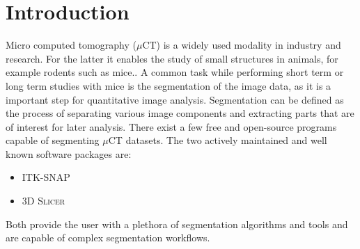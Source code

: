 




\clearpage

\section{Introduction}
\begin{body}
Micro computed tomography ($\mu$CT) is a widely used modality in industry and research. For the latter it enables the study of small structures in animals, for example rodents such as mice.\cite{percianoInsight3DMicroCT2017}.
A common task while performing short term or long term studies with mice is the segmentation of the image data, as it is a important step for quantitative image analysis\cite{sheppardTechniquesHelicalScanning2014}. Segmentation can be defined as the process of separating various image components and extracting parts that are of interest for later analysis\cite{percianoInsight3DMicroCT2017}.
\newline
There exist a few free and open-source programs capable of segmenting $\mu$CT datasets.
The two actively maintained and well known\cite{mandoliniComparisonThree3D2022,virziComprehensiveReview3D2020} software packages are:
\begin{itemize}
	\item[\ding{108}] \textsc{ITK-SNAP}\cite{yushkevichUserguided3DActive2006}
	\item[\ding{108}] \textsc{3D Slicer}\cite{kikinis3DSlicerPlatform2014}
\end{itemize}
Both provide the user with a plethora of segmentation algorithms and tools and are capable of complex segmentation workflows.
\end{body}

